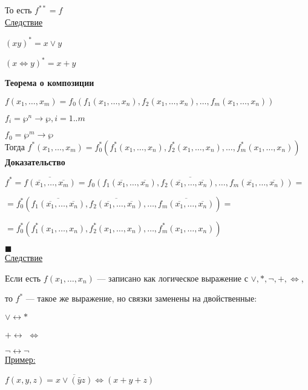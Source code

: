 \documentclass[a4paper, 12pt] {article}
\begin{document}
То есть $ f^{**} = f $\\

\underline{Следствие }

$ (xy)^{*} = x \vee y $

$ (x\Leftrightarrow y)^{*} = x + y $

\newpage

\textbf{Теорема о композиции}

$ f(x_{1}, \dots, x_{m}) = f_{0}(f_{1}(x_{1}, \dots, x_{n}), f_{2}(x_{1}, \dots, x_{n}), \dots, f_{m}(x_{1}, \dots, x_{n})) $

$ f_{i} = \wp^{n} \rightarrow \wp, i = 1..m $

$ f_{0} = \wp^{m} \rightarrow \wp $\\

Тогда $ f^{*}(x_{1}, \dots, x_{m}) = f_{0}^{*}(f_{1}^{*}(x_{1}, \dots, x_{n}), f_{2}^{*}(x_{1}, \dots, x_{n}), \dots, f_{m}^{*}(x_{1}, \dots, x_{n})) $\\

\textbf{Доказательство}

$ f^{*} =  \overline{f(\overline{x_{1}}, \dots, \overline{x_{m}})} = \overline{f_{0}(f_{1}(\overline{x_{1}}, \dots, \overline{x_{n}}), f_{2}(\overline{x_{1}}, \dots, \overline{x_{n}}), \dots, f_{m}(\overline{x_{1}}, \dots, \overline{x_{n}}))}=$

$ = f_{0}^{*}(\overline{f_{1}(\overline{x_{1}}, \dots, \overline{x_{n}})}, \overline{f_{2}(\overline{x_{1}}, \dots, \overline{x_{n}})}, \dots, \overline{f_{m}(\overline{x_{1}}, \dots, \overline{x_{n}})}) =$

$ = f_{0}^{*}(f_{1}^{*}(x_{1}, \dots, x_{n}), f_{2}^{*}(x_{1}, \dots, x_{n}), \dots, f_{m}^{*}(x_{1}, \dots, x_{n})) $

$ \blacksquare $\\

\underline{Следствие}

Если есть $ f(x_{1}, \dots, x_{n}) $ --- записано как логическое выражение с $ \vee, *, \neg, +, \Leftrightarrow  $,

то $ f^{*} $ --- такое же выражение, но связки заменены на двойственные:

$ \vee \leftrightarrow * $

$ + \leftrightarrow $  $\Leftrightarrow  $

$ \neg \leftrightarrow \neg $\\

\underline{Пример:}

$ f(x, y, z) = \overline{x \vee (\bar y z)} \Leftrightarrow  (x+y+z) $
\end{document}
